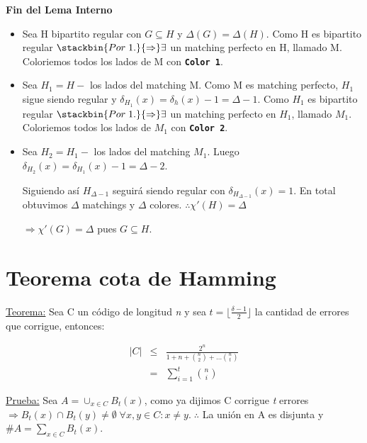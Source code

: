 \documentclass[12pt,a4paper]{report}
\newcounter{neq}
\begin{document}
		\textbf{Fin del Lema Interno}
		
		\vspace{5mm}
		\begin{itemize}
			\item Sea H bipartito regular con $G \subseteq H$ y $\Delta(G) = \Delta(H)$. Como H es bipartito regular $\stackbin{Por \; 1.}{\Rightarrow} \exists$ un matching perfecto en H, llamado M. Coloriemos todos los lados de M con \textbf{\texttt{Color 1}}.

			\item Sea $H_{1} = H - $ los lados del matching M. Como M es matching perfecto, $H_{1}$ sigue siendo regular y $\delta_{H_{1}}(x) = \delta_{h}(x) - 1 = \Delta - 1$. Como $H_{1}$ es bipartito regular $\stackbin{Por \; 1.}{\Rightarrow} \exists$ un matching perfecto en $H_{1}$, llamado $M_{1}$. Coloriemos todos los lados de $M_{1}$ con \textbf{\texttt{Color 2}}. 
			
			\item Sea $H_{2} = H_{1} - $ los lados del matching $M_{1}$. Luego $\delta_{H_{2}}(x) = \delta_{H_{1}}(x) - 1 = \Delta - 2$. 
			
			
			Siguiendo así $H_{\Delta - 1}$ seguirá siendo regular con $ \delta_{H_{\Delta - 1}}(x) = 1$. En total obtuvimos $ \Delta $ matchings y $ \Delta $ colores. $\therefore \chi '(H) = \Delta$
			
			$\Rightarrow \chi ' (G) = \Delta$ pues $G \subseteq H$.
		\end{itemize}
			
	\section{Teorema cota de Hamming}
		
		\underline{Teorema:} Sea C un código de longitud \textit{n} y sea $ t = \lfloor \frac{\delta - 1}{2} \rfloor$ la cantidad de errores que corrigue, entonces:
		
		\begin{eqnarray}
			\nonumber \lvert C \rvert &\leq & \frac{2^{n}}{1 + n + {n \choose 2} + \dotsc {n \choose t}} \\
			\nonumber &=& \sum_{i = 1}^{t} {n \choose i}
		\end{eqnarray}
		
		\underline{Prueba:} Sea $ A = \cup_{x \in C} B_{t}(x)$, como ya dijimos C corrigue \textit{t} errores $\Rightarrow B_{t}(x) \cap B_{t}(y) \neq \emptyset \; \forall x, y \in C : x \neq y. \; \therefore$ La unión en A es disjunta y $\#A = \sum_{x \in C} B_{t}(x)$.
		
\end{document}
